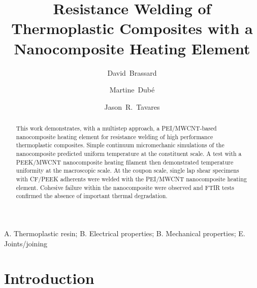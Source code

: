 \documentclass[11pt,review,times]{elsarticle}
\begin{document}


\title{Resistance Welding of Thermoplastic Composites with a Nanocomposite Heating Element}

\author[polymtl,crepec]{David~Brassard}
\author[ets,crepec]{Martine~Dubé}
\author[polymtl,crepec]{Jason~R.~Tavares}


\address[polymtl]{Department of Chemical Engineering, Polytechnique Montréal, P.O. Box 6079 Station Centre-Ville, Montréal, QC, H3C 3A7, Canada}
\address[ets]{Department of Mechanical Engineering, École de technologie supérieure, 1100 Notre-Dame Street West, Montréal, Québec, Canada, H3C 1K3}
\address[crepec]{Research Center for High Performance Polymer and Composite Systems (CREPEC), Polytechnique Montréal, P.O. Box 6079 Station Centre-Ville, Montréal, QC, H3C 3A7, Canada}

\begin{abstract}

This work demonstrates, with a multistep approach, a PEI/MWCNT-based nanocomposite heating element for resistance welding of high performance thermoplastic composites. 
Simple continuum micromechanic simulations of the nanocomposite predicted uniform temperature at the constituent scale. 
A test with a PEEK/MWCNT nanocomposite heating filament then demonstrated temperature uniformity at the macroscopic scale. 
At the coupon scale, single lap shear specimens with CF/PEEK adherents were welded with the PEI/MWCNT nanocomposite heating element. 
Cohesive failure within the nanocomposite were observed and FTIR tests confirmed the absence of important thermal degradation. 

\end{abstract}

\begin{keyword}
A. Thermoplastic resin;  B. Electrical properties;  B. Mechanical properties;  E. Joints/joining 
\end{keyword}

\maketitle

							\section{Introduction}
\end{document}
